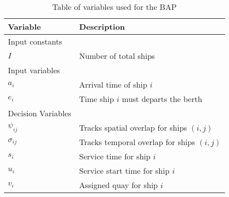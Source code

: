 \documentclass[11pt,a4paper,final]{article}
\begin{document}
\begin{table}[htbp]
\caption{\label{tab:bapvariables}Table of variables used for the BAP}
\centering
\begin{tabular}{ll}
\textbf{Variable} & \textbf{Description}\\
\hline
Input constants & \\
\(I\) & Number of total ships\\
\hline
Input variables & \\
\(a_i\) & Arrival time of ship \(i\)\\
\(e_i\) & Time ship \(i\) must departs the berth\\
\hline
Decision Variables & \\
\(\psi_{ij}\) & Tracks spatial overlap for ships \((i,j)\)\\
\(\sigma_{ij}\) & Tracks temporal overlap for ships \((i,j)\)\\
\(s_i\) & Service time for ship \(i\)\\
\(u_i\) & Service start time for ship \(i\)\\
\(v_i\) & Assigned quay for ship \(i\)\\
\hline
\end{tabular}
\end{table}




\end{document}
